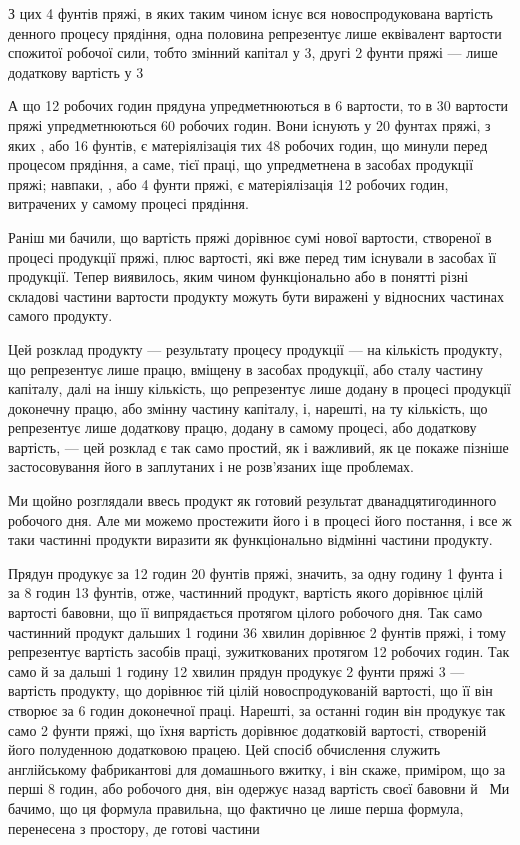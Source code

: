 
З цих 4 фунтів пряжі, в яких таким чином існує вся новоспродукована вартість денного процесу
прядіння, одна половина репрезентує лише еквівалент вартости спожитої робочої сили, тобто змінний капітал у 3, другі
2 фунти пряжі — лише додаткову вартість у 3

А що 12 робочих годин прядуна упредметнюються в 6 вартости, то в 30 вартости пряжі
упредметнюються 60 робочих годин. Вони існують у 20 фунтах пряжі, з яких ,
або 16 фунтів, є матеріялізація тих 48 робочих годин, що минули перед процесом прядіння, а саме,
тієї праці, що упредметнена в засобах продукції пряжі; навпаки, , або 4 фунти пряжі, є
матеріялізація 12 робочих годин, витрачених у самому процесі прядіння.

Раніш ми бачили, що вартість пряжі дорівнює сумі нової вартости, створеної в процесі продукції
пряжі, плюс вартості, які вже перед тим існували в засобах її продукції. Тепер виявилось, яким чином функціонально або в
понятті різні складові
частини вартости продукту можуть бути виражені у відносних частинах самого продукту.

Цей розклад продукту — результату процесу продукції — на кількість продукту, що репрезентує лише
працю, вміщену в
засобах продукції, або сталу частину капіталу, далі на іншу кількість, що репрезентує лише додану в
процесі продукції доконечну працю, або змінну частину капіталу, і, нарешті, на ту
кількість, що репрезентує лише додаткову працю, додану в самому процесі, або додаткову вартість, —
цей розклад є так само простий, як і важливий, як це покаже пізніше застосовування його в заплутаних
і не розв’язаних іще проблемах.

Ми щойно розглядали ввесь продукт як готовий результат дванадцятигодинного робочого дня. Але ми
можемо простежити
його і в процесі його постання, і все ж таки частинні продукти виразити як функціонально відмінні
частини продукту.

Прядун продукує за 12 годин 20 фунтів пряжі, значить, за одну годину 1 фунта і за 8 годин 13
фунтів, отже, частинний
продукт, вартість якого дорівнює цілій вартості бавовни, що її випрядається протягом цілого робочого
дня. Так само частинний продукт дальших 1 години 36 хвилин дорівнює 2 фунтів пряжі,
і тому репрезентує вартість засобів праці, зужиткованих протягом 12 робочих годин. Так само й за
дальші 1 годину 12 хвилин
прядун продукує 2 фунти пряжі \deq{} 3 — вартість продукту, що дорівнює тій цілій
новоспродукованій вартості, що її він створює за 6 годин доконечної праці. Нарешті, за останні 
годин він продукує так само 2 фунти пряжі, що їхня вартість дорівнює додатковій вартості, створеній
його полуденною додатковою працею. Цей спосіб обчислення служить англійському фабрикантові для домашнього вжитку, і він скаже,
приміром, що за перші 8 годин, або  робочого дня, він одержує назад вартість своєї бавовни
й~ Ми бачимо, що ця формула правильна, що фактично це лише перша формула, перенесена з
простору, де готові частини
\parbreak{}  %
